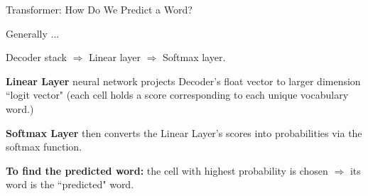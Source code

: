 \begin{frame}{Transformer: How Do We Predict a Word?}
    \large 
    
    Generally ...
    
    Decoder stack $\Rightarrow$ Linear layer $\Rightarrow$ Softmax layer. 

    \begin{itemizeSpaced}{7pt}
        \item \textbf{Linear Layer} neural network projects Decoder's float vector to larger dimension ``logit vector" (each cell holds a score corresponding to each unique vocabulary word.)
    
        \item \textbf{Softmax Layer} then converts the Linear Layer's scores into probabilities via the softmax function. 
    \end{itemizeSpaced}

    \textbf{To find the predicted word: } the cell with highest probability is chosen $\Rightarrow$ its word is the ``predicted" word. 

    
\end{frame}